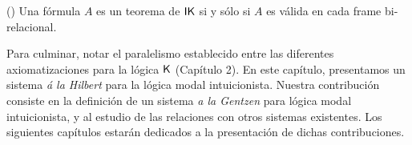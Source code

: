 
\begin{teo}
	 (\cite{servi1984,plotkin1986}) Una fórmula $A$ es un teorema de $\mathsf{IK}$ si y sólo si $A$ es válida en cada frame bi-relacional.
\end{teo}

Para culminar, notar el paralelismo establecido entre las diferentes axiomatizaciones para la lógica $\mathsf{K}$ (Capítulo 2). En este capítulo, presentamos un sistema \emph{á la Hilbert} para la lógica modal intuicionista. Nuestra contribución consiste en la definición de un sistema \emph{a la Gentzen} para lógica modal intuicionista, y al estudio de las relaciones con otros sistemas existentes. Los siguientes capítulos estarán dedicados a la presentación de dichas contribuciones.

